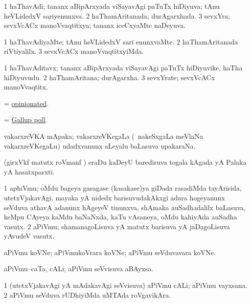 \bentry
{}
\gl{\gu}
\bmng
\bnum
\num{1} haThavAdi; tananx aBipArxyada viSayavAgi paTuTx hiDiyuva; tAnu heVLidedxV sariyenunxva. 
\num{2} haThamAritanada; durAgarxhada. 
\num{3} sevxYra; sevxVcACx manoVvaqtitxya; tananx iceCxyaMte naDeyuva. 
\enum
\emng
\eentry

\bentry
{}
\gl{\kirxvi}
\bmng
\bnum
\num{1} haThavAdiyaMte; tAnu heVLidedxV sari enunxvaMte. 
\num{2} haThamAritanada riVtiyalilx. 
\num{3} sevxVcACx manoVvaqtitxyiMda. 
\enum
\emng
\eentry

\bentry
{}
\gl{\nA}
\bmng
\bnum
\num{1} haThavAditavx; tananx aBipArxyada viSayavAgi paTuTx hiDiyuvike, haTha hiDiyuvudu. 
\num{2} haThamAritana; durAgarxha. 
\num{3} sevxYrate; sevxVcACx manoVvaqtitx. 
\enum
\emng
\eentry

\bentry
{}
\gl{\gu}
\bmng
= \hyperlink{opinionated}{opinionated}. 
\emng
\eentry

\bentry
{}
\gl{\nA}
\bmng
= \hyperref{kandict_g.pdf}{G}{Gallup poll}{Gallup poll}. 
\emng
\eentry

\bentry
{}
\gl{\nA}
\bmng
vakarxreVKA mApaka; vakarxreVKegaLa (\kanmu\ nakeSxgaLa meVlaNa vakarxreVKegaLu) udadxvanunx aLeyalu baLasuva upakaraNa. 
\emng
\eentry

\bentry
{}
\gl{\nA}
\bmng
(girxVkf matutx roVmanf \pArxkatx) eraDu kaDeyU barediruva togala kAgada yA Palaka yA hasatxparxti. 
\emng
\eentry

\bentry
{}
\gl{\nA}
\bmng
\bnum
\num{1} aphiVmu; oMdu bageya gasagase (kasakase)ya giDada rasadiMda tayArisida, utetxVjakavAgi, mayaka yA nidedx barisuvudakAkxgi adara hogeyanunx seVduva athavA adanunx hAgeyeV tinunxva, shAmaka auSadhadalilx baLasuva, keMpu CAyeya kaMdu baNaNxda, kaTu vAsaneya, oMdu kahiyAda auSadha vasutx. 
\num{2} aPiVmu; shamanagoLisuva yA matutx barisuva yA jaDagoLisuva yAvudeV vasutx. 
\enum
\emng
\eentry

\bentry
{}
\gl{\nA}
\bmng
aPiVmu koVNe; aPiVmukoVrara koVNe; aPiVmu seVduvavara koVNe. 
\emng
\eentry

\bentry
{}
\gl{\nA}
\bmng
aPiVmu--caTa, cALi; aPiVmu seVvisuva aBAyxsa. 
\emng
\eentry

\bentry
{}
\gl{\nA}
\bmng
\bnum
\num{1} (utetxVjakavAgi yA mAdakavAgi seVvisuva) aPiVmu cALi; aPiVmu vayxsana. 
\num{2} aPiVmu seVduva rUDhiyiMda uMTAda roVgavikAra. 
\enum
\emng
\eentry

